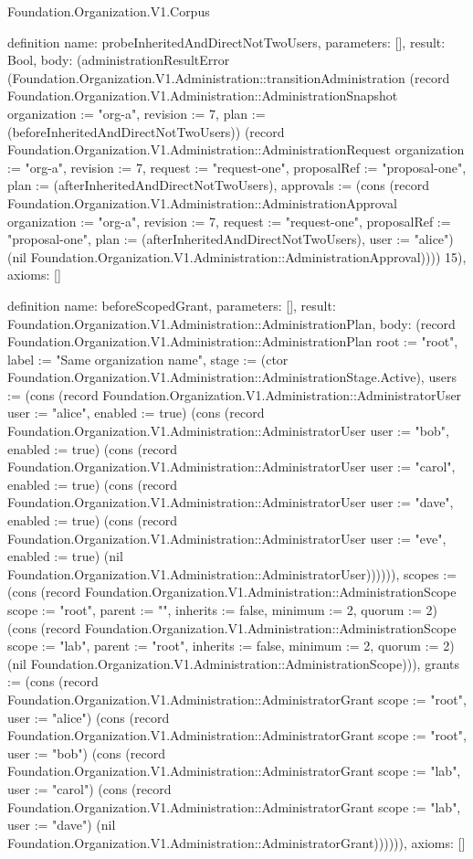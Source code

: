 \begin{lexlean}{Foundation.Organization.V1.Corpus}
\begin{semanticmodule}
definition{
  name: probeInheritedAndDirectNotTwoUsers,
  parameters: [],
  result: Bool,
  body: (administrationResultError (Foundation.Organization.V1.Administration::transitionAdministration (record Foundation.Organization.V1.Administration::AdministrationSnapshot {organization := "org-a", revision := 7, plan := (beforeInheritedAndDirectNotTwoUsers)}) (record Foundation.Organization.V1.Administration::AdministrationRequest {organization := "org-a", revision := 7, request := "request-one", proposalRef := "proposal-one", plan := (afterInheritedAndDirectNotTwoUsers), approvals := (cons (record Foundation.Organization.V1.Administration::AdministrationApproval {organization := "org-a", revision := 7, request := "request-one", proposalRef := "proposal-one", plan := (afterInheritedAndDirectNotTwoUsers), user := "alice"}) (nil Foundation.Organization.V1.Administration::AdministrationApproval))})) 15),
  axioms: []
}

definition{
  name: beforeScopedGrant,
  parameters: [],
  result: Foundation.Organization.V1.Administration::AdministrationPlan,
  body: (record Foundation.Organization.V1.Administration::AdministrationPlan {root := "root", label := "Same organization name", stage := (ctor Foundation.Organization.V1.Administration::AdministrationStage.Active), users := (cons (record Foundation.Organization.V1.Administration::AdministratorUser {user := "alice", enabled := true}) (cons (record Foundation.Organization.V1.Administration::AdministratorUser {user := "bob", enabled := true}) (cons (record Foundation.Organization.V1.Administration::AdministratorUser {user := "carol", enabled := true}) (cons (record Foundation.Organization.V1.Administration::AdministratorUser {user := "dave", enabled := true}) (cons (record Foundation.Organization.V1.Administration::AdministratorUser {user := "eve", enabled := true}) (nil Foundation.Organization.V1.Administration::AdministratorUser)))))), scopes := (cons (record Foundation.Organization.V1.Administration::AdministrationScope {scope := "root", parent := "", inherits := false, minimum := 2, quorum := 2}) (cons (record Foundation.Organization.V1.Administration::AdministrationScope {scope := "lab", parent := "root", inherits := false, minimum := 2, quorum := 2}) (nil Foundation.Organization.V1.Administration::AdministrationScope))), grants := (cons (record Foundation.Organization.V1.Administration::AdministratorGrant {scope := "root", user := "alice"}) (cons (record Foundation.Organization.V1.Administration::AdministratorGrant {scope := "root", user := "bob"}) (cons (record Foundation.Organization.V1.Administration::AdministratorGrant {scope := "lab", user := "carol"}) (cons (record Foundation.Organization.V1.Administration::AdministratorGrant {scope := "lab", user := "dave"}) (nil Foundation.Organization.V1.Administration::AdministratorGrant)))))}),
  axioms: []
}


\end{semanticmodule}
\end{lexlean}
